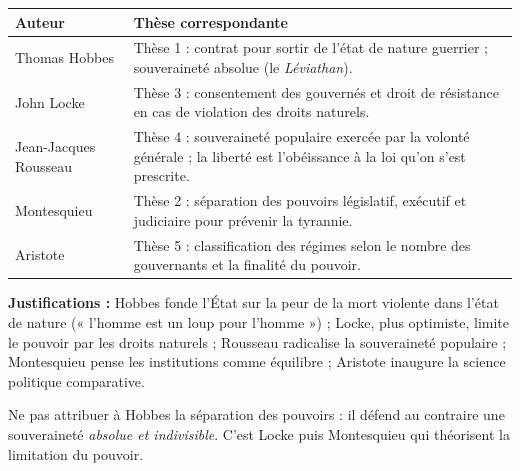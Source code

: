 \documentclass[11pt]{article}
\begin{document}
\begin{corrige}
\begin{center}
\begin{tabularx}{\linewidth}{|l|X|}\hline
\textbf{Auteur} & \textbf{Thèse correspondante} \\ \hline
Thomas Hobbes & Thèse 1 : contrat pour sortir de l'état de nature guerrier ; souveraineté absolue (le \emph{Léviathan}). \\ \hline
John Locke & Thèse 3 : consentement des gouvernés et droit de résistance en cas de violation des droits naturels. \\ \hline
Jean-Jacques Rousseau & Thèse 4 : souveraineté populaire exercée par la volonté générale ; la liberté est l'obéissance à la loi qu'on s'est prescrite. \\ \hline
Montesquieu & Thèse 2 : séparation des pouvoirs législatif, exécutif et judiciaire pour prévenir la tyrannie. \\ \hline
Aristote & Thèse 5 : classification des régimes selon le nombre des gouvernants et la finalité du pouvoir. \\ \hline
\end{tabularx}
\end{center}

\textbf{Justifications :} Hobbes fonde l'État sur la peur de la mort violente dans l'état de nature (« l'homme est un loup pour l'homme ») ; Locke, plus optimiste, limite le pouvoir par les droits naturels ; Rousseau radicalise la souveraineté populaire ; Montesquieu pense les institutions comme équilibre ; Aristote inaugure la science politique comparative.
\end{corrige}

\begin{attention}
Ne pas attribuer à Hobbes la séparation des pouvoirs : il défend au contraire une souveraineté \emph{absolue et indivisible}. C'est Locke puis Montesquieu qui théorisent la limitation du pouvoir.
\end{attention}
\end{document}
